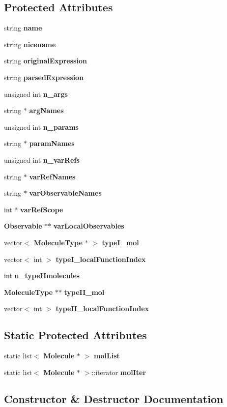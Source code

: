 \subsection*{Protected Attributes}
\begin{CompactItemize}
\item 
string {\bf name}
\item 
string {\bf nicename}
\item 
string {\bf originalExpression}
\item 
string {\bf parsedExpression}
\item 
unsigned int {\bf n\_\-args}
\item 
string $\ast$ {\bf argNames}
\item 
unsigned int {\bf n\_\-params}
\item 
string $\ast$ {\bf paramNames}
\item 
unsigned int {\bf n\_\-varRefs}
\item 
string $\ast$ {\bf varRefNames}
\item 
string $\ast$ {\bf varObservableNames}
\item 
int $\ast$ {\bf varRefScope}
\item 
{\bf Observable} $\ast$$\ast$ {\bf varLocalObservables}
\item 
vector$<$ {\bf MoleculeType} $\ast$ $>$ {\bf typeI\_\-mol}
\item 
vector$<$ int $>$ {\bf typeI\_\-localFunctionIndex}
\item 
int {\bf n\_\-typeIImolecules}
\item 
{\bf MoleculeType} $\ast$$\ast$ {\bf typeII\_\-mol}
\item 
vector$<$ int $>$ {\bf typeII\_\-localFunctionIndex}
\end{CompactItemize}
\subsection*{Static Protected Attributes}
\begin{CompactItemize}
\item 
static list$<$ {\bf Molecule} $\ast$ $>$ {\bf molList}
\item 
static list$<$ {\bf Molecule} $\ast$ $>$::iterator {\bf molIter}
\end{CompactItemize}


\subsection{Constructor \& Destructor Documentation}
